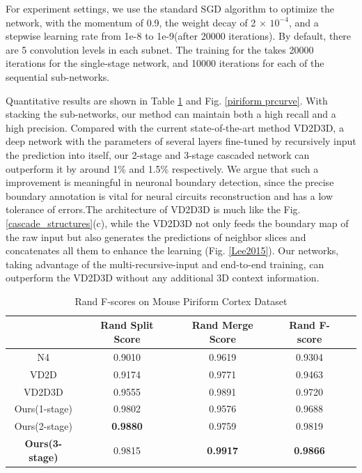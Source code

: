 \documentclass[senior]{IPSstyle}
\begin{document}
For experiment settings, we use the standard SGD algorithm to optimize the network, with the momentum of 0.9, the weight decay of 2 \(\times\) \(10^{-4}\), and a stepwise learning rate from 1e-8 to 1e-9(after 20000 iterations). By default, there are 5 convolution levels in each subnet. The training for the takes 20000 iterations for the single-stage network, and 10000 iterations for each of the sequential sub-networks. 

Quantitative results are shown in Table \ref{piriform fscore} and Fig. \ref{piriform prcurve}. With stacking the sub-networks, our method can maintain both a high recall and a high precision. Compared with the current state-of-the-art method VD2D3D\cite{Lee2015}, a deep network with the parameters of several layers fine-tuned by recursively input the prediction into itself, our 2-stage and 3-stage cascaded network can outperform it by around 1\% and 1.5\% respectively. We argue that such a improvement is meaningful in neuronal boundary detection, since the precise boundary annotation is vital for neural circuits reconstruction and has a low tolerance of errors.The architecture of VD2D3D is much like the Fig. \ref{cascade_structures}(c), while the VD2D3D not only feeds the boundary map of the raw input but also generates the predictions of neighbor slices and concatenates all them to enhance the learning (Fig. \ref{Lee2015}). Our networks, taking advantage of the multi-recursive-input and end-to-end training, can outperform the VD2D3D without any additional 3D context information. 

\begin{table}[t]
\renewcommand{\arraystretch}{1.2}
\caption{Rand F-scores on Mouse Piriform Cortex Dataset\cite{Lee2015}}
\label{outcome}
\begin{center}
\begin{tabular}{|c|c|c|c|c|}
\hline
&\multicolumn{1}{c|}{Rand Split Score}
&\multicolumn{1}{c|}{Rand Merge Score}
&\multicolumn{1}{c|}{Rand F-score}\\
\hline
N4\cite{Ciresan2012} 			& 0.9010 	& 0.9619 	& 0.9304	\\	\hline
VD2D\cite{Lee2015} 		& 0.9174	& 0.9771 	& 0.9463 	\\	\hline
VD2D3D\cite{Lee2015}	& 0.9555	& 0.9891	& 0.9720    \\	\hline
Ours(1-stage) 			& 0.9802 	& 0.9576	& 0.9688	\\	\hline
Ours(2-stage) 			& \textbf{0.9880}	& 0.9759 	& 0.9819 	\\	\hline
\textbf{Ours(3-stage)} 	& 0.9815 	& \textbf{0.9917} 	& \textbf{0.9866} 	\\	\hline
\end{tabular}
\end{center}
\label{piriform fscore}
\end{table}
\end{document}
